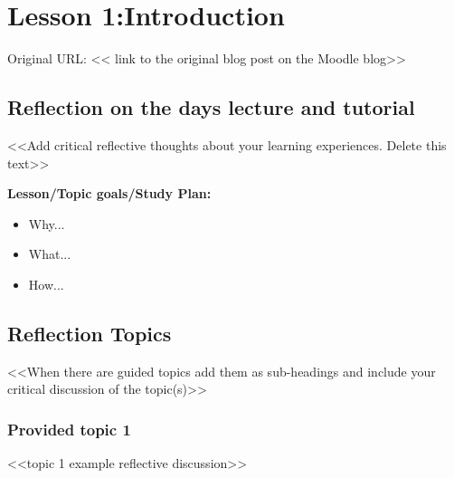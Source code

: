 
\section{Lesson 1:Introduction} %

Original URL: << link to the original blog post on the Moodle blog>> %



\subsection{Reflection on the days lecture and tutorial}

<<Add critical reflective thoughts about your learning experiences. Delete this text>>

{\bfseries{Lesson/Topic goals/Study Plan:}}
\begin{itemize}
    \item Why...
    \item What...
    \item How...
\end{itemize}


\subsection{Reflection Topics}

<<When there are guided topics add them as sub-headings and include your critical discussion of the topic(s)>>

\blindtext[3]  %

\subsubsection{Provided topic 1}

<<topic 1 example reflective discussion>>

\blindtext[3] %

